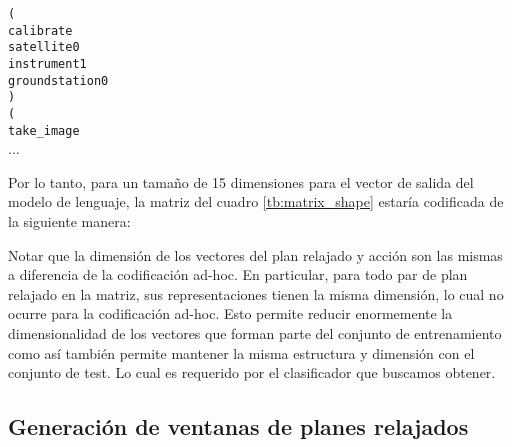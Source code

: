 \begin{center}
\verb|(| \\
\verb|calibrate| \\
\verb|satellite0| \\
\verb|instrument1| \\
\verb|groundstation0| \\
\verb|)| \\
\verb|(| \\
\verb|take_image| \\
...
\end{center}

Por lo tanto, para un tamaño de 15 dimensiones para el vector de salida del modelo de lenguaje, la matriz del cuadro \ref{tb:matrix_shape} estaría codificada de la siguiente manera:

\begin{table}[h!]
\centering
{}
 \caption{Ejemplos etiquetados a partir de un plan relajado y una acción}
 \label{tb:matrix_shape}
\end{table}

Notar que la dimensión de los vectores del plan relajado y acción son las mismas a diferencia de la codificación ad-hoc. En particular, para todo par de plan relajado en la matriz, sus representaciones tienen la misma dimensión, lo cual no ocurre para la codificación ad-hoc. Esto permite reducir enormemente la dimensionalidad de los vectores que forman parte del conjunto de entrenamiento como así también permite mantener la misma estructura y dimensión con el conjunto de test.
Lo cual es requerido por el clasificador que buscamos obtener.

\subsection{Generación de ventanas de planes relajados}


